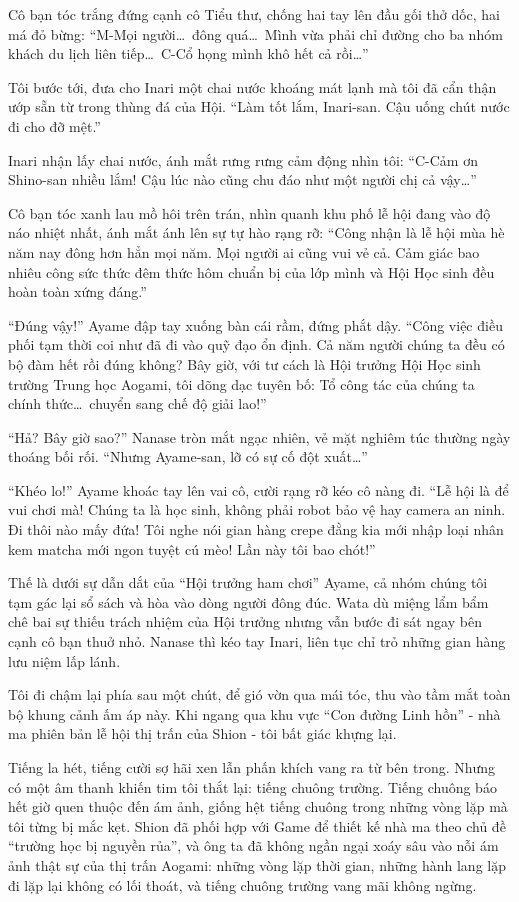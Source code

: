 \documentclass[../main.tex]{subfiles}
\begin{document}
Cô bạn tóc trắng đứng cạnh cô Tiểu thư, chống hai tay lên đầu gối thở dốc, hai má đỏ bừng: ``M-Mọi người\dots\ đông quá\dots\ Mình vừa phải chỉ đường cho ba nhóm khách du lịch liên tiếp\dots\ C-Cổ họng mình khô hết cả rồi\dots''

Tôi bước tới, đưa cho Inari một chai nước khoáng mát lạnh mà tôi đã cẩn thận ướp sẵn từ trong thùng đá của Hội. ``Làm tốt lắm, Inari-san. Cậu uống chút nước đi cho đỡ mệt.''

Inari nhận lấy chai nước, ánh mắt rưng rưng cảm động nhìn tôi: ``C-Cảm ơn Shino-san nhiều lắm! Cậu lúc nào cũng chu đáo như một người chị cả vậy\dots''

Cô bạn tóc xanh lau mồ hôi trên trán, nhìn quanh khu phố lễ hội đang vào độ náo nhiệt nhất, ánh mắt ánh lên sự tự hào rạng rỡ: ``Công nhận là lễ hội mùa hè năm nay đông hơn hẳn mọi năm. Mọi người ai cũng vui vẻ cả. Cảm giác bao nhiêu công sức thức đêm thức hôm chuẩn bị của lớp mình và Hội Học sinh đều hoàn toàn xứng đáng.''

``Đúng vậy!'' Ayame đập tay xuống bàn cái rầm, đứng phắt dậy. ``Công việc điều phối tạm thời coi như đã đi vào quỹ đạo ổn định. Cả năm người chúng ta đều có bộ đàm hết rồi đúng không? Bây giờ, với tư cách là Hội trưởng Hội Học sinh trường Trung học Aogami, tôi dõng dạc tuyên bố: Tổ công tác của chúng ta chính thức\dots\ chuyển sang chế độ giải lao!''

``Hả? Bây giờ sao?'' Nanase tròn mắt ngạc nhiên, vẻ mặt nghiêm túc thường ngày thoáng bối rối. ``Nhưng Ayame-san, lỡ có sự cố đột xuất\dots''

``Khéo lo!'' Ayame khoác tay lên vai cô, cười rạng rỡ kéo cô nàng đi. ``Lễ hội là để vui chơi mà! Chúng ta là học sinh, không phải robot bảo vệ hay camera an ninh. Đi thôi nào mấy đứa! Tôi nghe nói gian hàng crepe đằng kia mới nhập loại nhân kem matcha mới ngon tuyệt cú mèo! Lần này tôi bao chót!''

Thế là dưới sự dẫn dắt của ``Hội trưởng ham chơi'' Ayame, cả nhóm chúng tôi tạm gác lại sổ sách và hòa vào dòng người đông đúc. Wata dù miệng lẩm bẩm chê bai sự thiếu trách nhiệm của Hội trưởng nhưng vẫn bước đi sát ngay bên cạnh cô bạn thuở nhỏ. Nanase thì kéo tay Inari, liên tục chỉ trỏ những gian hàng lưu niệm lấp lánh.

Tôi đi chậm lại phía sau một chút, để gió vờn qua mái tóc, thu vào tầm mắt toàn bộ khung cảnh ấm áp này. Khi ngang qua khu vực ``Con đường Linh hồn'' - nhà ma phiên bản lễ hội thị trấn của Shion - tôi bất giác khựng lại.

Tiếng la hét, tiếng cười sợ hãi xen lẫn phấn khích vang ra từ bên trong. Nhưng có một âm thanh khiến tim tôi thắt lại: tiếng chuông trường. Tiếng chuông báo hết giờ quen thuộc đến ám ảnh, giống hệt tiếng chuông trong những vòng lặp mà tôi từng bị mắc kẹt. Shion đã phối hợp với Game để thiết kế nhà ma theo chủ đề ``trường học bị nguyền rủa'', và ông ta đã không ngần ngại xoáy sâu vào nỗi ám ảnh thật sự của thị trấn Aogami: những vòng lặp thời gian, những hành lang lặp đi lặp lại không có lối thoát, và tiếng chuông trường vang mãi không ngừng.
\end{document}
